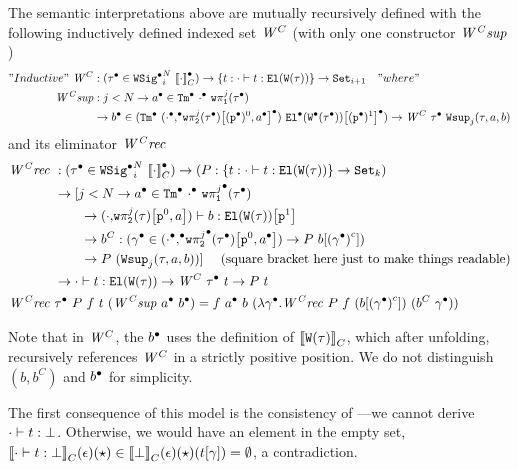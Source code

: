The semantic interpretations above are 
mutually recursively defined with the following inductively defined indexed set $\mathit{W}^C$ (with only one constructor $\mathit{W^Csup}$)
%
\begin{align*}
  "Inductive"~\mathit{W}^C &: ({\tau}^\bullet \in {\ensuremath{{\texttt{WSig}}^\bullet}}_{i}^{N}~{{\llbracket {\cdot} \rrbracket}_C^\bullet}) \to \{ t :  {\cdot} \vdash {t} : {\texttt{El}({\texttt{W}({\tau})})}  \} \to \texttt{Set}_{i + 1} \quad "where" \\
    \mathit{W^Csup} &: j < N \to {a}^\bullet \in {\texttt{Tm}}^\bullet~{{\cdot}^\bullet}~{\texttt{w}\pi^{j}_{\texttt{1}}({{\tau}^\bullet})} \\
    & \to {b}^\bullet \in ({\texttt{Tm}}^\bullet~{({\cdot}^\bullet {,}^\bullet {\ensuremath{\texttt{w}\pi^{j}_{\texttt{2}}({{\tau}^\bullet})}}\!\left[{{(\texttt{p}^\bullet)^{0}},{{a}^\bullet}}\right]^\bullet) }~{{{\texttt{El}}^\bullet({{\texttt{W}}^\bullet({{\tau}^\bullet})})}\!\left[{(\texttt{p}^\bullet)^{1}}\right]^\bullet}) \to \mathit{W}^C~{\tau}^\bullet~\texttt{Wsup}_{j}({\tau},{a},{b})
\end{align*}
and its eliminator $\mathit{W^Crec}$
\begin{align*}
  \mathit{W^Crec} \  &: ({\tau}^\bullet \in {\ensuremath{{\texttt{WSig}}^\bullet}}_{i}^{N}~{{\llbracket {\cdot} \rrbracket}_C^\bullet}) \to 
    (P : \{ t :  {\cdot} \vdash {t} : {\texttt{El}({\texttt{W}({\tau})})}  \} \to \texttt{Set}_{k})  \\
    & \to [j < N \to  {a}^\bullet \in {\texttt{Tm}}^\bullet~{{\cdot}^\bullet}~{{{\texttt{w}\pi^{j}_{\texttt{1}}}}^\bullet({{\tau}^\bullet})} \\ 
    & \quad \quad \to 
     {({\cdot} {,} \ensuremath{{\texttt{w}\pi^{j}_{\texttt{2}}({{\tau}})}\!\left[{{\texttt{p}^{0}},{{a}}}\right]}) } \vdash {b} : {{\texttt{El}({\texttt{W}({\tau})})}\!\left[{\texttt{p}^{1}}\right]}  \\ 
    & \quad \quad \to b^C : ({\gamma}^\bullet \in ({\cdot}^\bullet {,}^\bullet {\ensuremath{{{\texttt{w}\pi^{j}_{\texttt{2}}}}^\bullet({{\tau}^\bullet})}}\!\left[{{\texttt{p}^{0}},{{a}^\bullet}}\right]) \to P~{b}\!\left[{{({{\gamma}^\bullet})}^c}\right]) \\
    & \quad \quad \to P~(\texttt{Wsup}_{j}({\tau},{a},{b})) ] \quad \text{ (square bracket here just to make things readable)} \\
    & \to  {\cdot} \vdash {t} : {\texttt{El}({\texttt{W}({\tau})})}  \to \mathit{W}^C~{\tau}^\bullet~t \to P~t \\
  \mathit{W^Crec} \  & {\tau}^\bullet~P~f~t~(\mathit{W^Csup}~{a}^\bullet~{b}^\bullet) = f~{a}^\bullet~b~(\lambda {\ensuremath{\gamma}}^\bullet. \mathit{W^Crec}~P~f~({b}\!\left[{{({{\gamma}^\bullet})}^c}\right])~(b^C~{\gamma}^\bullet))
\end{align*}

Note that in $\mathit{W}^C$, the ${b}^\bullet$ uses the definition of
${\llbracket {\ensuremath{\texttt{W}({\tau})}} \rrbracket}_C$, which after unfolding, recursively references $\mathit{W}^C$
in a strictly positive position. %
We do not distinguish $(b, b^C)$ and ${b}^\bullet$ for simplicity.

The first consequence of this model is the consistency of \TT---we cannot derive
$ {\cdot} \vdash {t} : {\bot} $. Otherwise, we would have an element in the empty set,
${\llbracket {\ensuremath{ {\cdot} \vdash {t} : {\bot} }} \rrbracket}_C(\epsilon)(\star) \in
{\llbracket {\bot} \rrbracket}_C(\epsilon)(\star)({t}\!\left[{\gamma}\right]) = \emptyset$, a contradiction.

